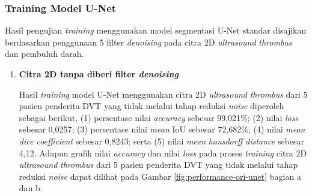 \subsubsection{Training Model U-Net}
Hasil pengujian \textit{training} menggunakan model segmentasi U-Net standar disajikan berdasarkan penggunaan 5 filter \textit{denoising} pada citra 2D \textit{ultrasound} \textit{thrombus} dan pembuluh darah.

\begin{enumerate}
	\item \textbf{Citra 2D tanpa diberi filter \textit{denoising}} 
	
	Hasil \textit{training} model U-Net menggunakan citra 2D \textit{ultrasound} \textit{thrombus} dari 5 pasien penderita DVT yang tidak melalui tahap reduksi \textit{noise} diperoleh sebagai berikut, (1) persentase nilai \textit{accuracy} sebesar 99,021\%; (2) nilai \textit{loss} sebesar 0,0257; (3) persentase nilai \textit{mean} IoU sebesar 72,682\%; (4) nilai \textit{mean} \textit{dice coefficient} sebesar 0,8243; serta (5) nilai \textit{mean} \textit{hausdorff distance} sebesar 4,12. Adapun grafik nilai \textit{accuracy} dan nilai \textit{loss} pada proses \textit{training} citra 2D \textit{ultrasound} \textit{thrombus} dari 5 pasien penderita DVT yang tidak melalui tahap reduksi \textit{noise} dapat dilihat pada Gambar \ref{fig:performance-ori-unet} bagian a dan b.
	

\end{enumerate}
